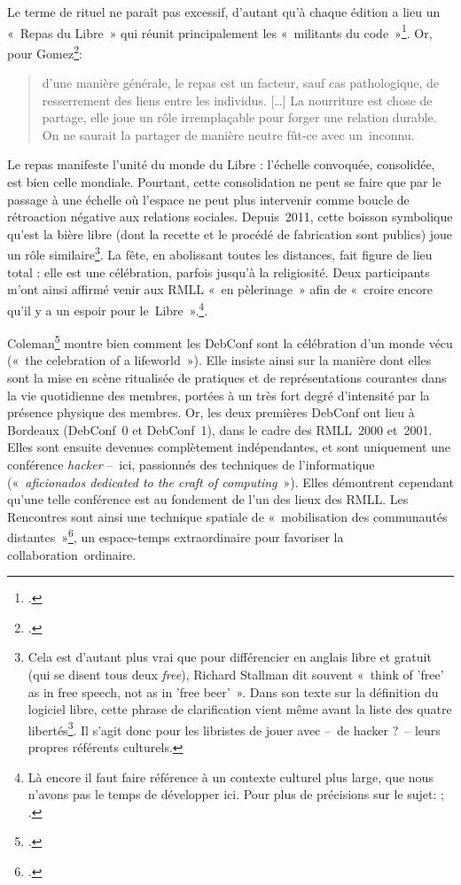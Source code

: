 \documentclass{FramateX}
\begin{document}
\begin{refsection}
Le terme de rituel ne paraît pas excessif, d'autant qu'à chaque édition
a lieu un «~Repas du Libre~» qui réunit principalement les
«~militants du
code~»\footnote{\cite{proulxles2006}.}. Or, pour
Gomez\footnote{\cite{gomezrepas1985}.}:

\begin{quote}
d'une manière générale, le repas est un facteur, sauf cas
pathologique, de resserrement des liens entre les individus. […] La
nourriture est chose de partage, elle joue un rôle irremplaçable pour
forger une relation durable. On ne saurait la partager de manière
neutre fût-ce avec un~inconnu.
\end{quote}

Le repas manifeste l'unité du monde du Libre : l'échelle convoquée,
consolidée, est bien celle mondiale. Pourtant, cette consolidation ne
peut se faire que par le passage à une échelle où l'espace ne peut plus
intervenir comme boucle de rétroaction négative aux relations sociales.
Depuis~2011, cette boisson symbolique qu'est la bière libre (dont la
recette et le procédé de fabrication sont publics) joue un rôle
similaire\footnote{Cela est d'autant plus vrai que pour différencier en
anglais libre et gratuit (qui se disent tous deux \textit{free}),
Richard Stallman dit souvent «~think of 'free' as in free speech, not as in
 'free beer'~». Dans son texte sur la
définition du logiciel libre, cette phrase de clarification vient même
avant la liste des quatre libertés\footnote{\cite[p.~43]{stallmanfree2002-1}.}. Il s'agit donc pour les libristes de jouer avec –~de hacker
?~– leurs propres référents culturels.}. La fête, en abolissant toutes
les distances, fait figure de lieu total : elle est une célébration,
parfois jusqu'à la religiosité. Deux participants m'ont ainsi affirmé
venir aux RMLL «~en pèlerinage~» afin de
«~croire encore qu'il y a un espoir pour
le~Libre~».\footnote{Là encore il faut faire référence à un contexte
culturel plus large, que nous n'avons pas le temps de développer ici.
Pour plus de précisions sur le sujet: \cite[p.~64-94]{keltytwo2008}; \cite[p.~85-94]{giraudles2010}.}.

Coleman\footnote{\cite{colemanhacker2010}.} montre bien comment les DebConf sont la célébration d'un monde vécu
(«~the celebration of a
lifeworld~»). Elle insiste ainsi sur la manière dont elles sont la
mise en scène ritualisée de pratiques et de représentations courantes
dans la vie quotidienne des membres, portées à un très fort degré
d'intensité par la présence physique des membres. Or, les deux
premières DebConf ont lieu à Bordeaux (DebConf~0 et DebConf~1), dans le
cadre des RMLL~2000 et~2001. Elles sont ensuite devenues complètement
indépendantes, et sont uniquement une conférence \textit{hacker} –~ici, passionnés
des techniques de l'informatique («~\textit{aficionados dedicated to the
craft of computing}~»). Elles démontrent cependant qu'une telle
conférence est au fondement de l'un des lieux des RMLL. Les Rencontres
sont ainsi une technique spatiale de «~mobilisation
des communautés
distantes~»\footnote{\cite{jullienhow2006}.}, un espace-temps extraordinaire pour favoriser la
collaboration~ordinaire.


\end{refsection}
\end{document}
